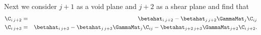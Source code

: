 Next we consider $j +1$ as a void plane and $j + 2$ as a shear plane and find that
\begin{eqnarray}
\C_{i \, j+2} &=& \betahat_{i \, j+2} - \betahat_{j \, j + 2} \GammaMat_j \C_{i j}\\
\C_{i \, j+3} &=& \betahat_{i \, j+3} - \betahat_{j \, j + 3} \GammaMat_j \C_{i j} - \betahat_{j+2 \, j+3} \GammaMat_{j+2} \C_{i \, j+2}.
\end{eqnarray}
  
  